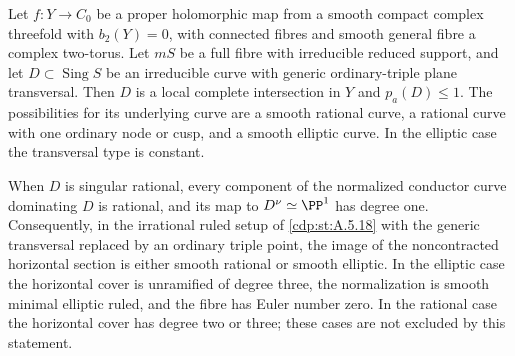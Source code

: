 
\begin{proposition}\label{cdp:st:A.5.19}
Let $f:Y\to C_0$ be a proper holomorphic map from a smooth
compact complex threefold with $b_2(Y)=0$, with connected
fibres and smooth general fibre a complex two-torus.
Let $mS$ be a full fibre with irreducible reduced support,
and let $D\subset\operatorname{Sing}S$ be an irreducible
curve with generic ordinary-triple plane transversal.
Then $D$ is a local complete intersection in $Y$ and
$p_a(D)\le1$. The possibilities for its underlying curve
are a smooth rational curve, a rational curve with one
ordinary node or cusp, and a smooth elliptic curve.
In the elliptic case the transversal type is constant.

When $D$ is singular rational, every component of the
normalized conductor curve dominating $D$ is rational,
and its map to $D^\nu\simeq\PP^1$ has degree one.
Consequently, in the irrational ruled setup of \ref{cdp:st:A.5.18}
with the generic transversal replaced by an ordinary
triple point, the image of the noncontracted horizontal
section is either smooth rational or smooth elliptic.
In the elliptic case the horizontal cover is unramified
of degree three, the normalization is smooth minimal
elliptic ruled, and the fibre has Euler number zero.
In the rational case the horizontal cover has degree
two or three; these cases are not excluded by this
statement.
\end{proposition}

